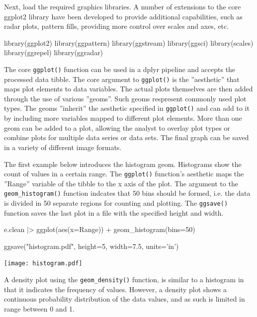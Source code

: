 \noindent Next, load the required graphics libraries. A number of extensions to the core ggplot2 library have been developed to provide additional capabilities, such as radar plots, pattern fills, providing more control over scales and axes, etc.

\begin{samepage}
\begin{Rcode}
library(ggplot2)
library(ggpattern)
library(ggstream)
library(ggsci)
library(scales)
library(ggrepel)
library(ggradar)
\end{Rcode}
\end{samepage}

The core \texttt{ggplot()} function can be used in a dplyr pipeline and accepts the processed data tibble. The core argument to \texttt{ggplot()} is the ''aesthetic'' that maps plot elements to data variables. The actual plots themselves are then added through the use of various ''geoms''. Such geoms respresent commonly used plot types. The geoms ''inherit'' the aesthetic specified in \texttt{ggplot()} and can add to it by including more variables mapped to different plot elements. More than one geom can be added to a plot, allowing the analyst to overlay plot types or combine plots for multiple data series or data sets. The final graph can be saved in a variety of different image formats.

The first example below introduces the histogram geom. Histograms show the count of values in a certain range. The \texttt{ggplot()} function's aesthetic maps the ''Range'' variable of the tibble to the x axis of the plot. The argument to the \texttt{geom\_histogram()} function indcates that 50 bins should be formed, i.e. the data is divided in 50 separate regions for counting and plotting. The \texttt{ggsave()} function saves the last plot in a file with the specified height and width.

\begin{samepage}
\begin{Rcode}
e.clean |>
  ggplot(aes(x=Range)) + 
    geom_histogram(bins=50)
    
ggsave("histogram.pdf", 
       height=5, width=7.5, units='in')
\end{Rcode}
\end{samepage}

\begin{center}
\texttt{[image: histogram.pdf]}
\end{center}

A density plot using the \texttt{geom\_density()} function, is similar to a histogram in that it indicates the frequency of values. However, a density plot shows a continuous probability distribution of the data values, and as such is limited in range between 0 and 1.

